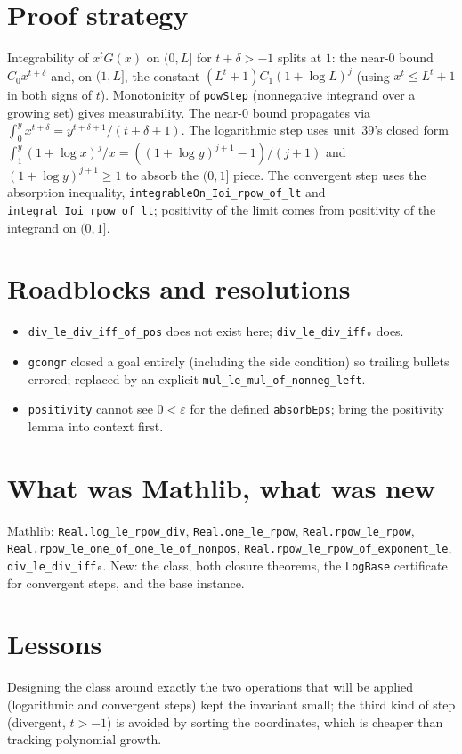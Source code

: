 \documentclass[11pt]{article}
\begin{document}
\section{Proof strategy}
Integrability of $x^tG(x)$ on $(0,L]$ for $t+\delta>-1$ splits at $1$: the near-$0$ bound
$C_0x^{t+\delta}$ and, on $(1,L]$, the constant $(L^t+1)C_1(1+\log L)^j$ (using $x^t\le L^t+1$ in
both signs of $t$). Monotonicity of \texttt{powStep} (nonnegative integrand over a growing set) gives
measurability. The near-$0$ bound propagates via $\int_0^yx^{t+\delta}=y^{t+\delta+1}/(t+\delta+1)$.
The logarithmic step uses unit~39's closed form $\int_1^y(1+\log x)^j/x=((1+\log y)^{j+1}-1)/(j+1)$
and $(1+\log y)^{j+1}\ge1$ to absorb the $(0,1]$ piece. The convergent step uses the absorption
inequality, \texttt{integrableOn\_Ioi\_rpow\_of\_lt} and \texttt{integral\_Ioi\_rpow\_of\_lt}; positivity
of the limit comes from positivity of the integrand on $(0,1]$.

\section{Roadblocks and resolutions}
\begin{itemize}
\item \texttt{div\_le\_div\_iff\_of\_pos} does not exist here; \texttt{div\_le\_div\_iff₀} does.
\item \texttt{gcongr} closed a goal entirely (including the side condition) so trailing bullets
errored; replaced by an explicit \texttt{mul\_le\_mul\_of\_nonneg\_left}.
\item \texttt{positivity} cannot see $0<\varepsilon$ for the defined \texttt{absorbEps}; bring the
positivity lemma into context first.
\end{itemize}

\section{What was Mathlib, what was new}
Mathlib: \texttt{Real.log\_le\_rpow\_div}, \texttt{Real.one\_le\_rpow}, \texttt{Real.rpow\_le\_rpow},
\texttt{Real.rpow\_le\_one\_of\_one\_le\_of\_nonpos}, \texttt{Real.rpow\_le\_rpow\_of\_exponent\_le},
\texttt{div\_le\_div\_iff₀}. New: the class, both closure theorems, the \texttt{LogBase} certificate for
convergent steps, and the base instance.

\section{Lessons}
Designing the class around exactly the two operations that will be applied (logarithmic and convergent
steps) kept the invariant small; the third kind of step (divergent, $t>-1$) is avoided by sorting the
coordinates, which is cheaper than tracking polynomial growth.
\end{document}
